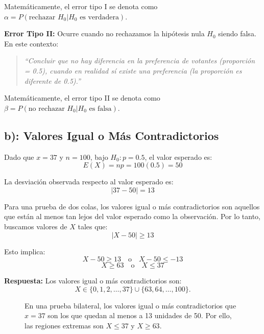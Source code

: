 \documentclass[12pt]{article}
\begin{document}
Matemáticamente, el error tipo I se denota como $\alpha = P(\text{rechazar } H_0 | H_0 \text{ es verdadera})$.

\textbf{Error Tipo II:} Ocurre cuando no rechazamos la hipótesis nula $H_0$ siendo falsa. En este contexto:

\begin{quote}
    \textit{``Concluir que no hay diferencia en la preferencia de votantes (proporción = 0.5), cuando en realidad sí existe una preferencia (la proporción es diferente de 0.5).''}
\end{quote}

Matemáticamente, el error tipo II se denota como $\beta = P(\text{no rechazar } H_0 | H_0 \text{ es falsa})$.

\subsection*{b): Valores Igual o Más Contradictorios}

Dado que $x = 37$ y $n = 100$, bajo $H_0: p = 0.5$, el valor esperado es:
$$E(X) = np = 100(0.5) = 50$$

La desviación observada respecto al valor esperado es:
$$|37 - 50| = 13$$

Para una prueba de dos colas, los valores igual o más contradictorios son aquellos que están al menos tan lejos del valor esperado como la observación. Por lo tanto, buscamos valores de $X$ tales que:
$$|X - 50| \geq 13$$

Esto implica:
$$X - 50 \geq 13 \quad \text{o} \quad X - 50 \leq -13$$
$$X \geq 63 \quad \text{o} \quad X \leq 37$$

\textbf{Respuesta:} Los valores igual o más contradictorios son:
\[
X \in \{0, 1, 2, \ldots, 37\} \cup \{63, 64, \ldots, 100\}.
\]

\begin{figure}[H]
\centering
{}
\caption{En una prueba bilateral, los valores igual o más contradictorios que $x=37$ son los que quedan al menos a 13 unidades de 50. Por ello, las regiones extremas son $X\leq 37$ y $X\geq 63$.}
\end{figure}
\end{document}

